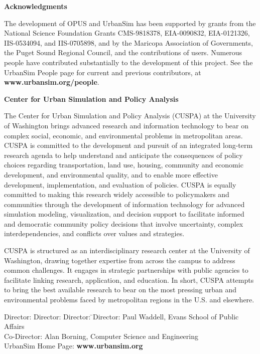 
{\bf \large Acknowledgments}

The development of OPUS and UrbanSim has been supported by
grants from the National Science Foundation Grants CMS-9818378,
EIA-0090832, EIA-0121326, IIS-0534094, and IIS-0705898,
and by the Maricopa Association
of Governments, the Puget Sound Regional Council, and
the contributions of users. Numerous people have contributed 
substantially to the development of this project. See the
UrbanSim People page for current and previous contributors,
at {\bf www.urbansim.org/people}.   

{\bf \large Center for Urban Simulation and Policy Analysis}

The Center for Urban Simulation and Policy Analysis (CUSPA) at the
University of Washington brings advanced research and information
technology to bear on complex social, economic, and environmental
problems in metropolitan areas.  CUSPA is committed to the
development and pursuit of an integrated long-term research agenda
to help understand and anticipate the consequences of policy
choices regarding transportation, land use, housing, community and
economic development, and environmental quality, and to enable
more effective development, implementation, and evaluation of
policies. CUSPA is equally committed to making this research
widely accessible to policymakers and communities through the
development of information technology for advanced simulation
modeling, visualization, and decision support to facilitate
informed and democratic community policy decisions that involve
uncertainty, complex interdependencies, and conflicts over values
and strategies.

CUSPA is structured as an interdisciplinary research center at the
University of Washington, drawing together expertise from across
the campus to address common challenges.  It engages in strategic
partnerships with public agencies to facilitate linking research,
application, and education.  In short, CUSPA attempts to bring the
best available research to bear on the most pressing urban and
environmental problems faced by metropolitan regions in the U.S.
and elsewhere.

\begin{tabbing}
Director: Director: Director: \= \kill Director:\> Paul Waddell,
Evans School of Public Affairs \\
Co-Director:\> Alan Borning, Computer Science and Engineering \\

UrbanSim Home Page: \> {\bf www.urbansim.org} 
\end{tabbing}

